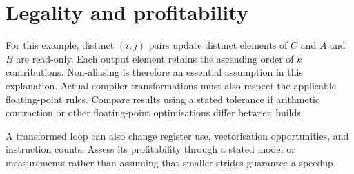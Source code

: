 \section{Legality and profitability}
For this example, distinct $(i,j)$ pairs update distinct elements of $C$ and
$A$ and $B$ are read-only. Each output element retains the ascending order of
$k$ contributions. Non-aliasing is therefore an essential assumption in this
explanation. Actual compiler transformations must also respect the applicable
floating-point rules. Compare results using a stated tolerance if arithmetic
contraction or other floating-point optimisations differ between builds.

A transformed loop can also change register use, vectorisation opportunities,
and instruction counts. Assess its profitability through a stated model or
measurements rather than assuming that smaller strides guarantee a speedup.
